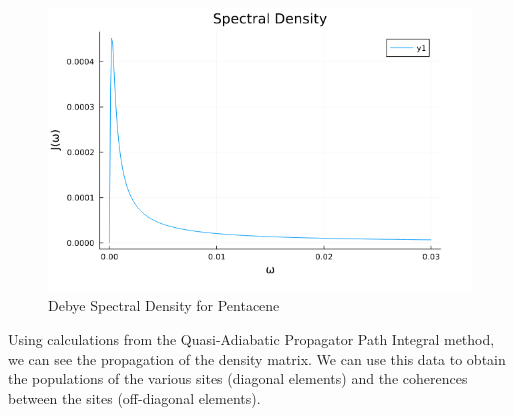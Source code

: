\begin{figure}
    \centering
    \includegraphics[scale=0.3]{Figures/jw_pentacene.png}
    \caption{Debye Spectral Density for Pentacene}
\end{figure}

Using calculations from the Quasi-Adiabatic Propagator Path Integral method, we can see the propagation of the density matrix. We can use this data to obtain the populations of the various sites (diagonal elements) and the coherences between the sites (off-diagonal elements).

